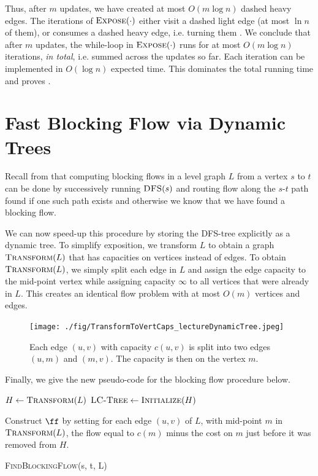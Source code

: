 Thus, after $m$ updates, we have created at most $O(m \log n)$ dashed heavy edges. The iterations of $\textsc{Expose}(\cdot)$ either visit a dashed light edge (at most $\ln n$ of them), or consumes a dashed heavy edge, i.e. turning them .
We conclude that after $m$ updates, the while-loop in $\textsc{Expose}(\cdot)$ runs for at most $O(m \log n)$ iterations, \emph{in total}, i.e. summed across the updates so far. Each iteration can be implemented in $O(\log n)$ expected time. This dominates the total running time and proves .

\section{Fast Blocking Flow via Dynamic Trees}

Recall from  that computing blocking flows in a level graph $L$ from a vertex $s$ to $t$ can be done by successively running $\textsc{DFS}(s)$ and routing flow along the $s$-$t$ path found if one such path exists and otherwise we know that we have found a blocking flow. 

We can now speed-up this procedure by storing the DFS-tree explicitly as a dynamic tree. To simplify exposition, we transform $L$ to obtain a graph $\textsc{Transform}(L)$ that has capacities on vertices instead of edges. To obtain $\textsc{Transform}(L)$, we simply split each edge in $L$ and assign the edge capacity to the mid-point vertex while assigning capacity $\infty$ to all vertices that were already in $L$. This creates an identical flow problem with at most $O(m)$ vertices and edges.

\begin{figure}[!ht]
    \centering
    \texttt{[image: ./fig/TransformToVertCaps\_lectureDynamicTree.jpeg]}
    \caption{Each edge $(u,v)$ with capacity $c(u,v)$ is split into two edges $(u,m)$ and $(m,v)$. The capacity is then on the vertex $m$.}
    \label{fig:my_label}
\end{figure}

Finally, we give the new pseudo-code for the blocking flow procedure below.

\begin{algorithm}[H]
  \SetAlgoLined
  $H \leftarrow \textsc{Transform}(L)$\;
  $\textsc{LC-Tree} \gets \textsc{Initialize}(H)$\;
  
  Construct $\ff$ by setting for each edge $(u,v)$ of $L$, with mid-point $m$ in $\textsc{Transform}(L)$, the flow equal to $c(m)$ minus the cost on $m$ just before it was removed from $H$.
  \caption{\textsc{FindBlockingFlow}(s, t, L)}
\end{algorithm}

